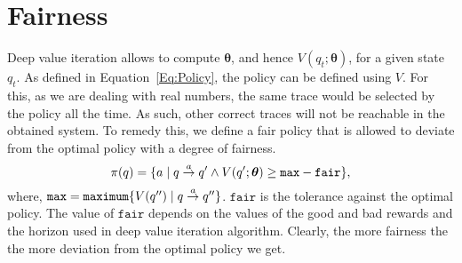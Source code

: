 \section{Fairness}
Deep value iteration allows to compute $\bm{\theta}$, and hence $V(q_{t};\bm{\theta})$, for a given state $q_t$. As defined in Equation~\ref{Eq:Policy}, the policy can be defined using $V$. For this, as we are dealing with real numbers, the same trace would be selected by the policy all the time. As such, other correct traces will not be reachable in the obtained system. To remedy this, we define a fair policy that is allowed to deviate from the optimal policy with a degree of fairness.  
\begin{equation}
\label{Eq:Policy}
\pi(q) = \{a \mid q \goesto[a] q' \wedge V(q';\bm{\theta}) \geq \mathtt{max} - \mathtt{fair}\},
\end{equation}
where, $\mathtt{max} = \mathtt{maximum}\{V(q'') \mid q \goesto[a] q''\}$.  $\mathtt{fair}$ is the tolerance against the optimal policy. The value of $\mathtt{fair}$ depends on the values of the good and bad rewards and the  horizon used in deep value iteration algorithm. Clearly, the more fairness the the more deviation from the optimal policy we get. 




